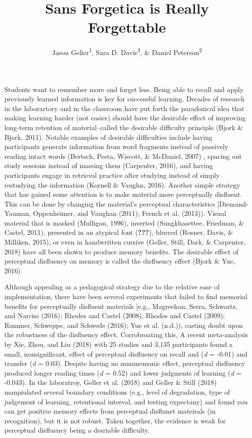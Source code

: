 \documentclass[english,doc]{apa6}
\author{Jason Geller\textsuperscript{1}, Sara D. Davis\textsuperscript{2}, \& Daniel Peterson\textsuperscript{2}}
\affiliation{
\vspace{0.5cm}
\textsuperscript{1} University of Iowa\\\textsuperscript{2} Skidmore College}
\title{Sans Forgetica is Really Forgettable}
\date{}
\begin{document}
\maketitle

Students want to remember more and forget less. Being able to recall and apply previously learned information is key for successful learning. Decades of research in the laborartory and in the classroom have put forth the paradoxical idea that making learning harder (not easier) should have the desirable effect of improving long-term retention of material--called the desirable difficulty principle (Bjork \& Bjork, 2011). Notable examples of desirable difficulties include having participants generate information from word fragments instead of passively reading intact words (Bertsch, Pesta, Wiscott, \& McDaniel, 2007) , spacing out study sessions instead of massing them (Carpenter, 2016), and having participants engage in retrieval practice after studying instead of simply restudying the information (Kornell \& Vaughn, 2016). Another simple strategy that has gained some attention is to make material more perceptually disfluent. This can be done by changing the material's perceptual characteristics {[}Diemand-Yauman, Oppenheimer, and Vaughan (2011); French et al. (2013)). Visual material that is masked (Mulligan, 1996), inverted (Sungkhasettee, Friedman, \& Castel, 2011), presented in an atypical font ({\textbf{???}}), blurred (Rosner, Davis, \& Milliken, 2015), or even in handwritten cursive (Geller, Still, Dark, \& Carpenter, 2018) have all been shown to produce memory benefits. The desirable effect of perceptual disfluency on memory is called the disfluency effect (Bjork \& Yue, 2016)

Although appealing as a pedagogical strategy due to the relative ease of implementation, there have been several experiments that failed to find memorial benefits for perceptually disfluent materials {[}e.g., Magreehan, Serra, Schwartz, and Narciss (2016); Rhodes and Castel (2008), Rhodes and Castel (2009); Rummer, Schweppe, and Schwede (2016); Yue et al. (n.d.)), casting doubt upon the robustness of the disfluency effect. Corrobroating this, A recent meta-analysis by Xie, Zhou, and Liu (2018) with 25 studies and 3,135 participants found a small, nonsignificant, effect of perceptual disfluency on recall and (\emph{d} = -0.01) and transfer (\emph{d} = 0.03). Despite having no mnnmemonic effect, perceptual disfluency produced longer reading times (\emph{d} = 0.52) and lower judgments of learning (\emph{d} = -0.043). In the laboratroy, Geller et al. (2018) and Geller \& Still (2018) manpiulated several boundary conditions (e.g., level of degradation, type of judgement of learning, retentional interval, and testing expectany) and found you can get positive memory effects from perceptual disflunet mateirals (in recognition), but it is not robust. Taken together, the evidence is weak for perceptual disfluency being a desriable difficulty.
\end{document}
